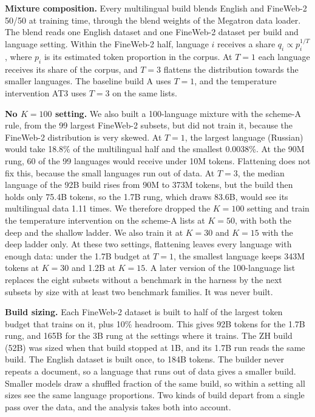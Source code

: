 


\textbf{Mixture composition.} Every multilingual build blends English and FineWeb-2 50/50 at training time, through the blend weights of the Megatron data loader. The blend reads one English dataset and one FineWeb-2 dataset per build and language setting. Within the FineWeb-2 half, language $i$ receives a share $q_i \propto p_i^{1/T}$, where $p_i$ is its estimated token proportion in the corpus. At $T=1$ each language receives its share of the corpus, and $T=3$ flattens the distribution towards the smaller languages. The baseline build A uses $T=1$, and the temperature intervention AT3 uses $T=3$ on the same lists.

\textbf{No $K=100$ setting.} We also built a 100-language mixture with the scheme-A rule, from the 99 largest FineWeb-2 subsets, but did not train it, because the FineWeb-2 distribution is very skewed. At $T=1$, the largest language (Russian) would take 18.8\% of the multilingual half and the smallest 0.0038\%. At the 90M rung, 60 of the 99 languages would receive under 10M tokens. Flattening does not fix this, because the small languages run out of data. At $T=3$, the median language of the 92B build rises from 90M to 373M tokens, but the build then holds only 75.4B tokens, so the 1.7B rung, which draws 83.6B, would see its multilingual data 1.11 times. We therefore dropped the $K=100$ setting and train the temperature intervention on the scheme-A lists at $K=50$, with both the deep and the shallow ladder. We also train it at $K=30$ and $K=15$ with the deep ladder only. At these two settings, flattening leaves every language with enough data: under the 1.7B budget at $T=1$, the smallest language keeps 343M tokens at $K=30$ and 1.2B at $K=15$. A later version of the 100-language list replaces the eight subsets without a benchmark in the harness by the next subsets by size with at least two benchmark families. It was never built.

\textbf{Build sizing.} Each FineWeb-2 dataset is built to half of the largest token budget that trains on it, plus 10\% headroom. This gives 92B tokens for the 1.7B rung, and 165B for the 3B rung at the settings where it trains. The ZH build (52B) was sized when that build stopped at 1B, and its 1.7B run reads the same build. The English dataset is built once, to 184B tokens. The builder never repeats a document, so a language that runs out of data gives a smaller build. Smaller models draw a shuffled fraction of the same build, so within a setting all sizes see the same language proportions. Two kinds of build depart from a single pass over the data, and the analysis takes both into account.

